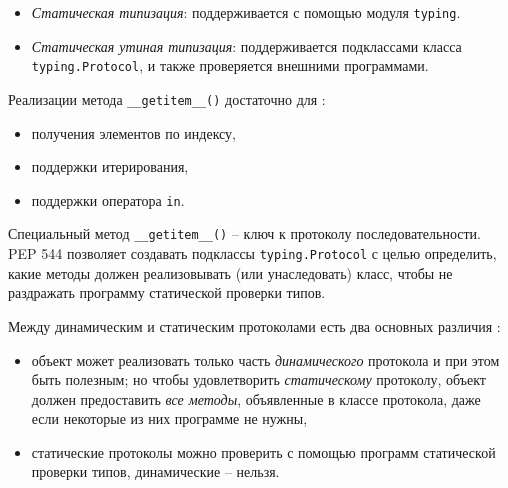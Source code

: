 \documentclass[%
	11pt,
	a4paper,
	utf8,
		]{article}
\begin{document}
\begin{itemize}
Пример \emph{гусиной типизации}
\begin{lstlisting}[
style = ironpython,
numbers = none
]
class Vector:
    ...
    def __matmul__(self, other):
        if (isinstance(other, abc.Sized) and isinstance(other, abc.Iterable)):
            if len(self) == len(other):
                return sum(a * b for a, b in zip(self, other))
            else:
                raise ValueError("@ requires vectors of equal length")
        else:
            return NotImplemented
    
    def __rmatmul__(self, other):
        return self @ other
\end{lstlisting}

Здесь оба операнда должны реализовывать методы \verb*|__len__| (\verb|abc.Sized|) и \verb*|__iter__| (\verb|abc.Iterable|).
	
	\item \emph{Статическая типизация}: поддерживается с помощью модуля \verb*|typing|.
	
	\item \emph{Статическая утиная типизация}: поддерживается подклассами класса \verb*|typing.Protocol|, и также проверяется внешними программами.
\end{itemize}

Реализации метода \verb*|__getitem__()| достаточно для \cite[]{ramalho:python-2022}:
\begin{itemize}
	\item получения элементов по индексу,
	
	\item поддержки итерирования,
	
	\item поддержки оператора \verb*|in|.
\end{itemize}

Специальный метод \verb*|__getitem__()| -- ключ к протоколу последовательности. PEP 544 позволяет создавать подклассы \verb*|typing.Protocol| с целью определить, какие методы должен реализовывать (или унаследовать) класс, чтобы не раздражать программу статической проверки типов.

Между динамическим и статическим протоколами есть два основных различия \cite[]{ramalho:python-2022}:
\begin{itemize}
	\item объект может реализовать только часть \emph{динамического} протокола и при этом быть полезным; но чтобы удовлетворить \emph{статическому} протоколу, объект должен предоставить \emph{все методы}, объявленные в классе протокола, даже если некоторые из них программе не нужны,
	
	\item статические протоколы можно проверить с помощью программ статической проверки типов, динамические -- нельзя.
\end{itemize}
\end{document}
